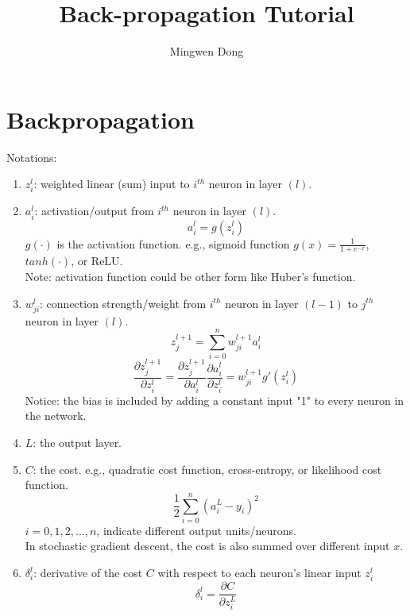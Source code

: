 \documentclass{extarticle}
\theoremstyle{definition}
\theoremstyle{definition}
\begin{document}
\title{Back-propagation Tutorial}
\author{Mingwen Dong}
\maketitle

\section{Backpropagation}
Notations:
\begin{enumerate}
	\item $z_i^l$: weighted linear (sum) input to $i^{th}$ neuron in layer $(l)$.
	\item $a_i^l$: activation/output from $i^{th}$ neuron in layer $(l)$. $$ a^l_i = g(z^l_i) $$
		 $g(\cdot)$ is the activation function. e.g., sigmoid function $g(x) = \frac{1}{1 + e^{-x}}$, $tanh(\cdot)$, or ReLU.\\
		 Note: activation function could be other form like Huber's function.
	\item $w_{ji}^l$: connection strength/weight from $i^{th}$ neuron in layer $(l-1)$ to $j^{th}$ neuron in layer $(l)$.
			$$ z_j^{l+1} = \sum_{i=0}^{n} w_{ji}^{l+1} a_i^l $$
			$$ \frac{\partial z_j^{l+1}}{\partial z_i^l} = \frac{\partial z_j^{l+1}}{\partial a_i^l} \frac{\partial a_i^l}{\partial z_i^l} = w_{ji}^{l+1} g'(z_i^l) $$
			Notice: the bias is included by adding a constant input "1" to every neuron in the network.
	\item $L$: the output layer.
	\item $C$: the cost. e.g., quadratic cost function, cross-entropy, or likelihood cost function.
			$$\frac{1}{2}\sum_{i=0}^{n}(a_i^L - y_i)^2$$
			$i = 0, 1, 2, ..., n$, indicate different output units/neurons.\\
			In stochastic gradient descent, the cost is also summed over different input $x$.
	\item $\delta_i^l$: derivative of the cost $C$ with respect to each neuron's linear input $z_i^l$
			$$ \delta_i^l = \frac{\partial C}{\partial z_i^L}  $$
\end{enumerate}
\end{document}
